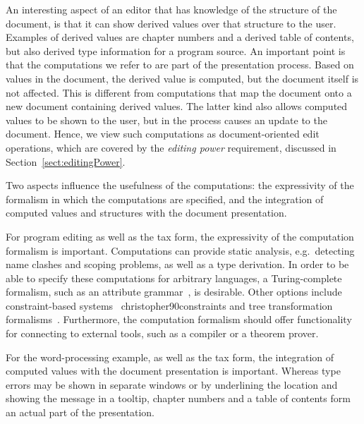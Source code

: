 \documentclass{entcs}
\begin{document}
An interesting aspect of an editor that has knowledge of the structure of the document, is that it can show derived values over that structure to the user. Examples of derived values are chapter numbers and a derived table of contents, but also derived type information for a program source. An important point is that the computations we refer to are part of the presentation process. Based on values in the document, the derived value is computed, but the document itself is not affected. This is different from computations that map the document onto a new document containing derived values. The latter kind also allows computed values to be shown to the user, but in the process causes an update to the document. Hence, we view such computations as document-oriented edit operations, which are covered by the {\em editing power} requirement, discussed in Section~\ref{sect:editingPower}.


Two aspects influence the usefulness of the computations: the expressivity of the formalism in which the computations are specified, and the integration of computed values and structures with the document presentation. 


For program editing as well as the tax form, the expressivity of the computation formalism is important. Computations can provide static analysis, e.g.\ detecting name clashes and scoping problems, as well as a type derivation. In order to be able to specify these computations for arbitrary languages, a Turing-complete formalism, such as an attribute grammar~\cite{swierstra04ag}, is desirable. Other options include constraint-based systems~\cite{ganzevoort92views,myers90garnet,borning81thinglab,ballance92pan} \bc christopher90constraints \ec and tree transformation formalisms~\cite{visser01stratego,xslt10}. Furthermore, the computation formalism should offer functionality for connecting to external tools, such as a compiler or a theorem prover.

For the word-processing example, as well as the tax form, the integration of computed values with the document presentation is important. Whereas type errors may be shown in separate windows or by underlining the location and showing the message in a tooltip, chapter numbers and a table of contents form an actual part of the presentation. 



%																
\end{document}
